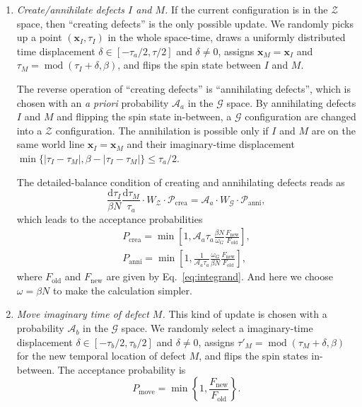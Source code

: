 \documentclass{article}
\DeclareMathOperator{\Mod}{mod}
\theoremstyle{plain} \newtheorem{thm}{Theorem}[section]
\theoremstyle{definition} \newtheorem{df}{Definition}[section]
\theoremstyle{definition} \newtheorem{eg}{Example}
\theoremstyle{remark} \newtheorem*{rmk}{Remark}
\begin{document}
\begin{enumerate}
  \item \textit{Create/annihilate defects $I$ and $M$.}
    If the current configuration is in the $\mathcal{Z}$ space, then ``creating defects'' is the only possible update. We randomly picks up a point $(\bm{x}_I, \tau_I)$ in the whole space-time, draws a uniformly distributed time displacement $\delta \in [-\tau_a/2, \tau/2]$ and $\delta \ne 0$, assigns $\bm{x}_M = \bm{x}_I$ and $\tau_M = \Mod(\tau_I+\delta, \beta)$, and flips the spin state between $I$ and $M$.

    The reverse operation of ``creating defects'' is ``annihilating defects'', which is chosen with an \textit{a priori} probability $\mathcal{A}_a$ in the $\mathcal{G}$ space. By annihilating defects $I$ and $M$ and flipping the spin state in-between, a $\mathcal{G}$ configuration are changed into a $\mathcal{Z}$ configuration. The annihilation is possible only if $I$ and $M$ are on the same world line $\bm{x}_I = \bm{x}_M$ and their imaginary-time displacement $\min\{|\tau_I-\tau_M|, \beta-|\tau_I-\tau_M|\} \le \tau_a/2$.

    The detailed-balance condition of creating and annihilating defects reads as
    \begin{equation}
      \frac{\mathrm{d}\tau_I}{\beta N}\frac{\mathrm{d}\tau_M}{\tau_a}\cdot W_\mathcal{Z}\cdot\mathcal{P}_\text{crea} = \mathcal{A}_a\cdot W_\mathcal{G}\cdot\mathcal{P}_\text{anni},
    \end{equation}
    which leads to the acceptance probabilities
    \begin{gather}
      P_\text{crea} = \min \left[ 1, \mathcal{A}_a \tau_a \frac{\beta N}{\omega_G}\frac{F_\text{new}}{F_\text{old}} \right],\\
      P_\text{anni} = \min\left[ 1, \frac{1}{\mathcal{A}_a \tau_a}\frac{\omega_G}{\beta N}\frac{F_\text{new}}{F_\text{old}} \right],
    \end{gather}
    where $F_\text{old}$ and $F_\text{new}$ are given by Eq.~\ref{eq:integrand}. And here we choose $\omega = \beta N$ to make the calculation simpler.

  \item \textit{Move imaginary time of defect $M$.}
    This kind of update is chosen with a probability $\mathcal{A}_b$ in the $\mathcal{G}$ space. We randomly select a imaginary-time displacement $\delta \in [-\tau_b/2, \tau_b/2]$ and $\delta\ne 0$, assigns $\tau'_M = \Mod(\tau_M+\delta,\beta)$ for the new temporal location of defect $M$, and flips the spin states in-between. The acceptance probability is
    \begin{equation}
      P_\text{move} = \min\left\{1, \frac{F_\text{new}}{F_\text{old}}\right\}.
    \end{equation}


\end{enumerate}
\end{document}
